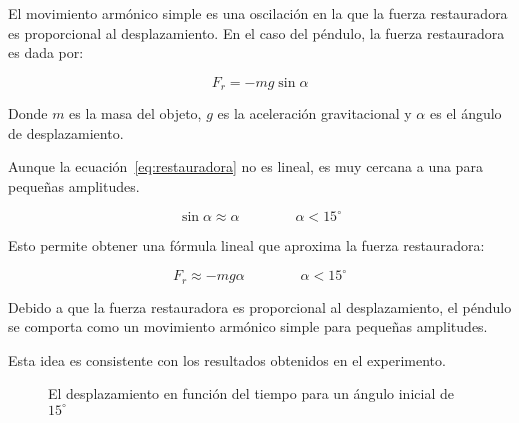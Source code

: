 \documentclass[twocolumn]{article}
\numberwithin{table}{section}
\begin{document}
El movimiento armónico simple es una oscilación en la que la fuerza restauradora
es proporcional al desplazamiento. En el caso del péndulo, la fuerza
restauradora es dada por:

\begin{equation}\label{eq:restauradora}
  F_{r} = -mg\sin{\alpha}
\end{equation}

Donde $m$ es la masa del objeto, $g$ es la aceleración gravitacional y $\alpha$
es el ángulo de desplazamiento.

Aunque la ecuación~\eqref{eq:restauradora} no es lineal, es muy cercana
a una para pequeñas amplitudes.

\begin{equation}
  \sin{\alpha} \approx \alpha \qquad\qquad \alpha < 15^{\circ}
\end{equation}

Esto permite obtener una fórmula lineal que aproxima la fuerza restauradora:

\begin{equation}
  F_{r} \approx -mg\alpha \qquad\qquad \alpha < 15^{\circ}
\end{equation}

Debido a que la fuerza restauradora es proporcional al desplazamiento, el
péndulo se comporta como un movimiento armónico simple para pequeñas amplitudes.

Esta idea es consistente con los resultados obtenidos en el experimento.

\begin{figure}[ht]
  \caption{El desplazamiento en función del tiempo para un ángulo
  inicial de $15^{\circ}$}\label{fig:sinusoide}
\end{figure}
\end{document}
